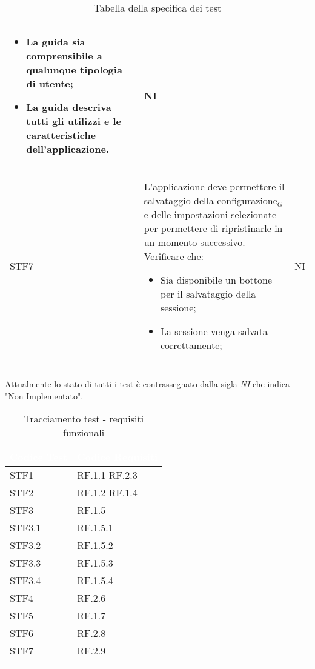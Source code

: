 \begin{center}
\begin{longtable}{|p{1.5cm}|p{11cm}|p{1cm}|}
\begin{itemize}
            \item La guida sia comprensibile a qualunque tipologia di utente;
            \item La guida descriva tutti gli utilizzi e le caratteristiche dell'applicazione.
        \end{itemize} & NI\\ \hline
        \rowcolor[HTML]{EFEFEF}
        STF7 & L'applicazione deve permettere il salvataggio della configurazione$_G$ e delle impostazioni selezionate per permettere di ripristinarle in un momento successivo. Verificare che: \begin{itemize}
            \item Sia disponibile un bottone per il salvataggio della sessione;
            \item La sessione venga salvata correttamente;
        \end{itemize}& NI\\ \hline
        \caption{Tabella della specifica dei test}
    \end{longtable}
\end{center}

    Attualmente lo stato di tutti i test è contrassegnato dalla sigla \textit{NI} che indica "Non Implementato".
\begin{center}
    \renewcommand\arraystretch{1.5}
    \centering
    \begin{longtable}{|p{3cm}|p{10cm}|} \hline
        \rowcolor[HTML]{036400}
        \textcolor{white}{\textbf{Codice Test}} & \textcolor{white}{\textbf{Codice Requisiti}} \\ \hline
        \rowcolor[HTML]{EFEFEF}
        STF1 & RF.1.1 RF.2.3\\ \hline
        \rowcolor[HTML]{C0C0C0}
        STF2 & RF.1.2 RF.1.4 \\ \hline
        \rowcolor[HTML]{EFEFEF}
        STF3 & RF.1.5 \\ \hline
        \rowcolor[HTML]{C0C0C0}
        STF3.1 & RF.1.5.1 \\ \hline
        \rowcolor[HTML]{EFEFEF}
        STF3.2 & RF.1.5.2 \\ \hline
        \rowcolor[HTML]{C0C0C0}
        STF3.3 & RF.1.5.3 \\ \hline
        \rowcolor[HTML]{EFEFEF}
        STF3.4 & RF.1.5.4 \\ \hline
        \rowcolor[HTML]{C0C0C0}
        STF4 & RF.2.6 \\ \hline
        \rowcolor[HTML]{EFEFEF}
        STF5 & RF.1.7 \\ \hline
        \rowcolor[HTML]{C0C0C0}
        STF6 & RF.2.8 \\ \hline
        \rowcolor[HTML]{EFEFEF}
        STF7 & RF.2.9 \\ \hline
        \caption{Tracciamento test - requisiti funzionali}
    \end{longtable}
\end{center}
